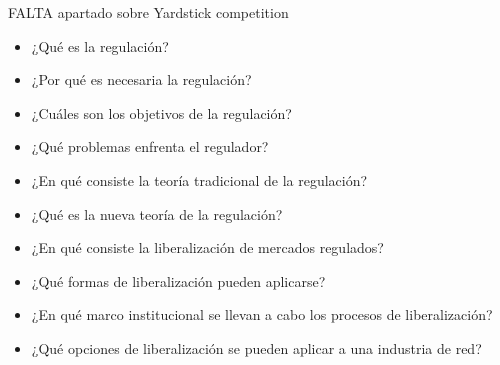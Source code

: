 \documentclass{nuevotema}
\begin{document}
\ideaclave

FALTA apartado sobre Yardstick competition


\begin{itemize}
	\item ¿Qué es la regulación?
	\item ¿Por qué es necesaria la regulación?
	\item ¿Cuáles son los objetivos de la regulación?
	\item ¿Qué problemas enfrenta el regulador?
	\item ¿En qué consiste la teoría tradicional de la regulación?
	\item ¿Qué es la nueva teoría de la regulación?
	\item ¿En qué consiste la liberalización de mercados regulados?
	\item ¿Qué formas de liberalización pueden aplicarse?
	\item ¿En qué marco institucional se llevan a cabo los procesos de liberalización?
	\item ¿Qué opciones de liberalización se pueden aplicar a una industria de red?
\end{itemize}


\esquemacorto
\end{document}
